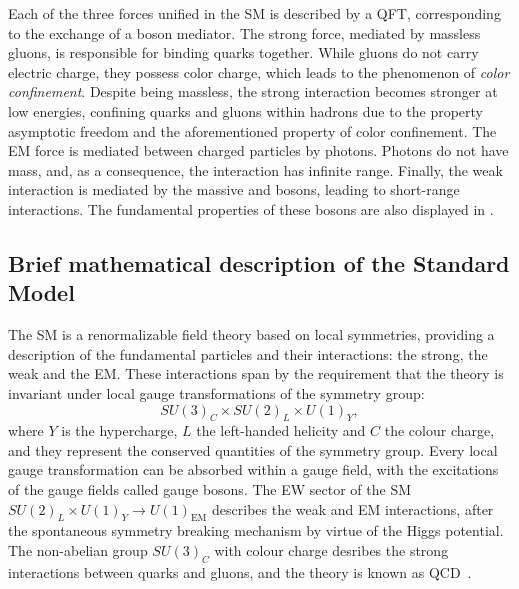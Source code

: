 Each of the three forces unified in the \ac{SM} is described by a \ac{QFT}, corresponding to the exchange of a boson mediator.
The strong force, mediated by massless gluons, is responsible for binding quarks together. While gluons do not carry electric charge, they possess color charge, which leads to the phenomenon of \textit{color confinement}. Despite being massless, the strong interaction becomes stronger at low energies, confining quarks and gluons within hadrons due to the property asymptotic freedom and the aforementioned property of color confinement.
The \ac{EM} force is mediated between charged particles by photons. Photons do not have mass, and, as a consequence, the interaction has infinite range.
Finally, the weak interaction is mediated by the massive \Wboson and \Zboson bosons, leading to short-range interactions. The fundamental properties of these bosons are also displayed in \Fig{\ref{fig:theory:sm:particles_interaction:particles}}.









\subsection{Brief mathematical description of the Standard Model}
\label{subsec:theory:sm:mathematical}

The \ac{SM} is a renormalizable field theory based on local symmetries, providing a description of the fundamental particles and their interactions: the strong, the weak and the \ac{EM}. These interactions span by the requirement that the theory is invariant under local gauge transformations of the symmetry group:
\begin{equation*}
    SU(3)_{C} \times SU(2)_{L} \times U(1)_{Y},
\end{equation*}
where \(Y\) is the hypercharge, \(L\) the left-handed helicity and \(C\) the colour charge, and they represent the conserved quantities of the symmetry group. Every local gauge transformation can be absorbed within a gauge field, with the excitations of the gauge fields called gauge bosons. The \ac{EW} sector of the \ac{SM} \(SU(2)_{L} \times U(1)_{Y} \to U(1)_{\text{EM}}\) describes the weak and \ac{EM} interactions, after the spontaneous symmetry breaking mechanism by virtue of the Higgs potential. The non-abelian group \(SU(3)_C\) with colour charge desribes the strong interactions between quarks and gluons, and the theory is known as \ac{QCD}~\cite{Ellis-1996-book}.

